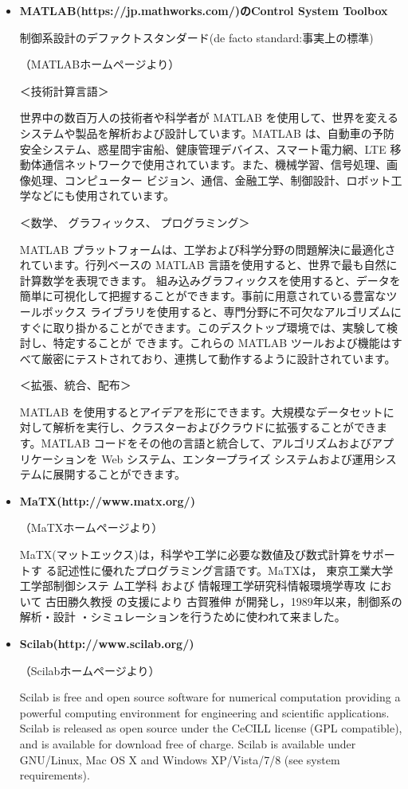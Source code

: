 \begin{itemize}
\item{\bf MATLAB(https://jp.mathworks.com/)のControl System Toolbox}

制御系設計のデファクトスタンダード(de facto standard:事実上の標準)

（MATLABホームページより）

＜技術計算言語＞

世界中の数百万人の技術者や科学者が MATLAB を使用して、世界を変えるシステムや製品を解析および設計しています。MATLAB は、自動車の予防安全システム、惑星間宇宙船、健康管理デバイス、スマート電力網、LTE 移動体通信ネットワークで使用されています。また、機械学習、信号処理、画像処理、コンピューター ビジョン、通信、金融工学、制御設計、ロボット工学などにも使用されています。

＜数学、 グラフィックス、 プログラミング＞

MATLAB プラットフォームは、工学および科学分野の問題解決に最適化されています。行列ベースの MATLAB 言語を使用すると、世界で最も自然に計算数学を表現できます。 組み込みグラフィックスを使用すると、データを簡単に可視化して把握することができます。事前に用意されている豊富なツールボックス ライブラリを使用すると、専門分野に不可欠なアルゴリズムにすぐに取り掛かることができます。このデスクトップ環境では、実験して検討し、特定することが できます。これらの MATLAB ツールおよび機能はすべて厳密にテストされており、連携して動作するように設計されています。

＜拡張、統合、配布＞

MATLAB を使用するとアイデアを形にできます。大規模なデータセットに対して解析を実行し、クラスターおよびクラウドに拡張することができます。MATLAB コードをその他の言語と統合して、アルゴリズムおよびアプリケーションを Web システム、エンタープライズ システムおよび運用システムに展開することができます。

\item{\bf MaTX(http://www.matx.org/)}

（MaTXホームページより）

MaTX(マットエックス)は，科学や工学に必要な数値及び数式計算をサポートす る記述性に優れたプログラミング言語です。MaTXは， 東京工業大学工学部制御システ ム工学科 および 情報理工学研究科情報環境学専攻 において 古田勝久教授 の支援により 古賀雅伸 が開発し，1989年以来，制御系の解析・設計 ・シミュレーションを行うために使われて来ました。

\item{\bf Scilab(http://www.scilab.org/)}

（Scilabホームページより）

Scilab is free and open source software for numerical computation providing a powerful computing environment for engineering and scientific applications. 
Scilab is released as open source under the CeCILL license (GPL compatible), and is available for download free of charge. Scilab is available under GNU/Linux, Mac OS X and Windows XP/Vista/7/8 (see system requirements).
\end{itemize}


